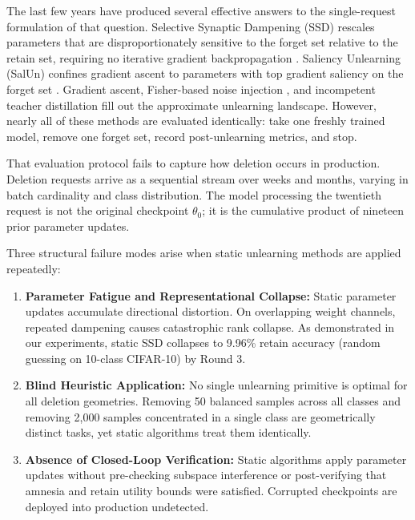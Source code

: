 \documentclass[conference]{IEEEtran}
\begin{document}
The last few years have produced several effective answers to the single-request formulation of that question. Selective Synaptic Dampening (SSD) rescales parameters that are disproportionately sensitive to the forget set relative to the retain set, requiring no iterative gradient backpropagation \cite{b4}. Saliency Unlearning (SalUn) confines gradient ascent to parameters with top gradient saliency on the forget set \cite{b5}. Gradient ascent, Fisher-based noise injection \cite{b7}, and incompetent teacher distillation \cite{b10} fill out the approximate unlearning landscape. However, nearly all of these methods are evaluated identically: take one freshly trained model, remove one forget set, record post-unlearning metrics, and stop.

That evaluation protocol fails to capture how deletion occurs in production. Deletion requests arrive as a sequential stream over weeks and months, varying in batch cardinality and class distribution. The model processing the twentieth request is not the original checkpoint $\theta_0$; it is the cumulative product of nineteen prior parameter updates. 

Three structural failure modes arise when static unlearning methods are applied repeatedly:
\begin{enumerate}
    \item \textbf{Parameter Fatigue and Representational Collapse:} Static parameter updates accumulate directional distortion. On overlapping weight channels, repeated dampening causes catastrophic rank collapse. As demonstrated in our experiments, static SSD collapses to 9.96\% retain accuracy (random guessing on 10-class CIFAR-10) by Round 3.
    \item \textbf{Blind Heuristic Application:} No single unlearning primitive is optimal for all deletion geometries. Removing 50 balanced samples across all classes and removing 2,000 samples concentrated in a single class are geometrically distinct tasks, yet static algorithms treat them identically.
    \item \textbf{Absence of Closed-Loop Verification:} Static algorithms apply parameter updates without pre-checking subspace interference or post-verifying that amnesia and retain utility bounds were satisfied. Corrupted checkpoints are deployed into production undetected.
\end{enumerate}
\end{document}
